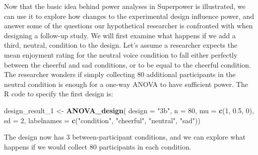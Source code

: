 \documentclass[
  english,
  ,jou,floatsintext]{apa6}
\newenvironment{Shaded}{\begin{snugshade}}{\end{snugshade}}
\newcommand{\DataTypeTok}[1]{\textcolor[rgb]{0.13,0.29,0.53}{#1}}
\newcommand{\DecValTok}[1]{\textcolor[rgb]{0.00,0.00,0.81}{#1}}
\newcommand{\FloatTok}[1]{\textcolor[rgb]{0.00,0.00,0.81}{#1}}
\newcommand{\KeywordTok}[1]{\textcolor[rgb]{0.13,0.29,0.53}{\textbf{#1}}}
\newcommand{\NormalTok}[1]{#1}
\newcommand{\StringTok}[1]{\textcolor[rgb]{0.31,0.60,0.02}{#1}}
\begin{document}
Now that the basic idea behind power analyses in Superpower is illustrated, we can use it to explore how changes to the experimental design influence power, and answer some of the questions our hypothetical researcher is confronted with when designing a follow-up study.
We will first examine what happens if we add a third, neutral, condition to the design.
Let's assume a researcher expects the mean enjoyment rating for the neutral voice condition to fall either perfectly between the cheerful and sad conditions, or to be equal to the cheerful condition.
The researcher wonders if simply collecting 80 additional participants in the neutral condition is enough for a one-way ANOVA to have sufficient power.
The R code to specify the first design is:

\begin{Shaded}
\begin{Highlighting}[]
\NormalTok{design_result_}\DecValTok{1}\NormalTok{ <-}\StringTok{ }\KeywordTok{ANOVA_design}\NormalTok{(}
  \DataTypeTok{design =} \StringTok{"3b"}\NormalTok{, }\DataTypeTok{n =} \DecValTok{80}\NormalTok{, }
  \DataTypeTok{mu =} \KeywordTok{c}\NormalTok{(}\DecValTok{1}\NormalTok{, }\FloatTok{0.5}\NormalTok{, }\DecValTok{0}\NormalTok{), }\DataTypeTok{sd =} \DecValTok{2}\NormalTok{, }
  \DataTypeTok{labelnames =} \KeywordTok{c}\NormalTok{(}\StringTok{"condition"}\NormalTok{, }
                 \StringTok{"cheerful"}\NormalTok{, }
                 \StringTok{"neutral"}\NormalTok{, }\StringTok{"sad"}\NormalTok{))}
\end{Highlighting}
\end{Shaded}

The design now has 3 between-participant conditions, and we can explore what happens if we would collect 80 participants in each condition.
\end{document}
